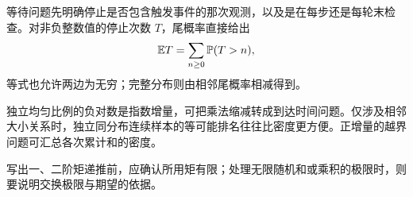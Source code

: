 等待问题先明确停止是否包含触发事件的那次观测，以及是在每步还是每轮末检查。对非负整数值的停止次数 $T$，尾概率直接给出
\[
\mathbb{E} T=\sum_{n\ge0}\mathbb{P}(T>n),
\]
等式也允许两边为无穷；完整分布则由相邻尾概率相减得到。

独立均匀比例的负对数是指数增量，可把乘法缩减转成到达时间问题。仅涉及相邻大小关系时，独立同分布连续样本的等可能排名往往比密度更方便。正增量的越界问题可汇总各次累计和的密度。

写出一、二阶矩递推前，应确认所用矩有限；处理无限随机和或乘积的极限时，则要说明交换极限与期望的依据。
\par\smallskip
